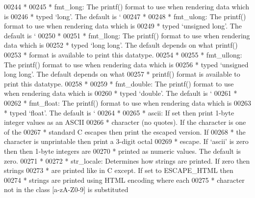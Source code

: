 \begin{DoxyCode}
{{{{{{{{00244 \textcolor{comment}{     *}
00245 \textcolor{comment}{     *   fmt\_long:   The printf() format to use when rendering data which is}
00246 \textcolor{comment}{     *               typed `long'. The default is `%
00247 \textcolor{comment}{     *}
00248 \textcolor{comment}{     *   fmt\_ulong:  The printf() format to use when rendering data which is}
00249 \textcolor{comment}{     *               typed `unsigned long'. The default is `%
00250 \textcolor{comment}{     *}
00251 \textcolor{comment}{     *   fmt\_llong:  The printf() format to use when rendering data which is}
00252 \textcolor{comment}{     *               typed `long long'. The default depends on what printf()}
00253 \textcolor{comment}{     *               format is available to print this datatype.}
00254 \textcolor{comment}{     *}
00255 \textcolor{comment}{     *   fmt\_ullong: The printf() format to use when rendering data which is}
00256 \textcolor{comment}{     *               typed `unsigned long long'. The default depends on what}
00257 \textcolor{comment}{     *               printf() format is available to print this datatype.}
00258 \textcolor{comment}{     *}
00259 \textcolor{comment}{     *   fmt\_double: The printf() format to use when rendering data which is}
00260 \textcolor{comment}{     *               typed `double'. The default is `%
00261 \textcolor{comment}{     *}
00262 \textcolor{comment}{     *   fmt\_float:  The printf() format to use when rendering data which is}
00263 \textcolor{comment}{     *               typed `float'. The default is `%
00264 \textcolor{comment}{     *}
00265 \textcolor{comment}{     *   ascii:      If set then print 1-byte integer values as an ASCII}
00266 \textcolor{comment}{     *               character (no quotes).  If the character is one of the}
00267 \textcolor{comment}{     *               standard C escapes then print the escaped version.  If}
00268 \textcolor{comment}{     *               the character is unprintable then print a 3-digit octal}
00269 \textcolor{comment}{     *               escape.  If `ascii' is zero then then 1-byte integers are}
00270 \textcolor{comment}{     *               printed as numeric values.  The default is zero.}
00271 \textcolor{comment}{     *}
00272 \textcolor{comment}{     *   str\_locale: Determines how strings are printed. If zero then strings}
00273 \textcolor{comment}{     *               are printed like in C except. If set to ESCAPE\_HTML then}
00274 \textcolor{comment}{     *               strings are printed using HTML encoding where each}
00275 \textcolor{comment}{     *               character not in the class [a-zA-Z0-9] is substituted}
}}}}}}}}}}}}
\end{DoxyCode}
